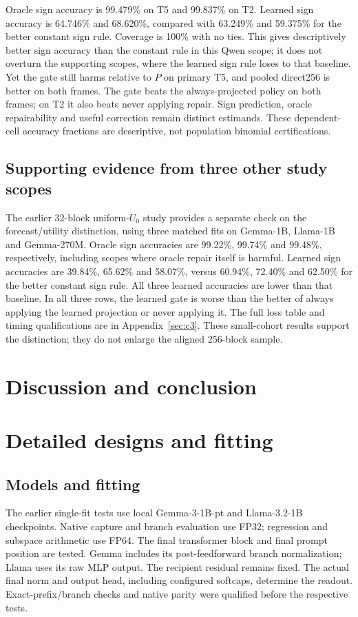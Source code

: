 Oracle sign accuracy is 99.479\% on T5 and 99.837\% on T2. Learned sign accuracy is 64.746\% and 68.620\%, compared with 63.249\% and 59.375\% for the better constant sign rule. Coverage is 100\% with no ties. This gives descriptively better sign accuracy than the constant rule in this Qwen scope; it does not overturn the supporting scopes, where the learned sign rule loses to that baseline. Yet the gate still harms relative to $P$ on primary T5, and pooled direct256 is better on both frames. The gate beats the always-projected policy on both frames; on T2 it also beats never applying repair. Sign prediction, oracle repairability and useful correction remain distinct estimands. These dependent-cell accuracy fractions are descriptive, not population binomial certifications.

\subsection{Supporting evidence from three other study scopes}
The earlier 32-block uniform-$U_0$ study provides a separate check on the forecast/utility distinction, using three matched fits on Gemma-1B, Llama-1B and Gemma-270M. Oracle sign accuracies are 99.22\%, 99.74\% and 99.48\%, respectively, including scopes where oracle repair itself is harmful. Learned sign accuracies are 39.84\%, 65.62\% and 58.07\%, versus 60.94\%, 72.40\% and 62.50\% for the better constant sign rule. All three learned accuracies are lower than that baseline. In all three rows, the learned gate is worse than the better of always applying the learned projection or never applying it. The full loss table and timing qualifications are in Appendix~\ref{sec:c3}. These small-cohort results support the distinction; they do not enlarge the aligned 256-block sample.
\section{Discussion and conclusion}


\appendix
\section{Detailed designs and fitting}
\label{sec:methods}

\subsection{Models and fitting}
The earlier single-fit tests use local Gemma-3-1B-pt and Llama-3.2-1B checkpoints. Native capture and branch evaluation use FP32; regression and subspace arithmetic use FP64. The final transformer block and final prompt position are tested. Gemma includes its post-feedforward branch normalization; Llama uses its raw MLP output. The recipient residual remains fixed. The actual final norm and output head, including configured softcaps, determine the readout. Exact-prefix/branch checks and native parity were qualified before the respective tests.

